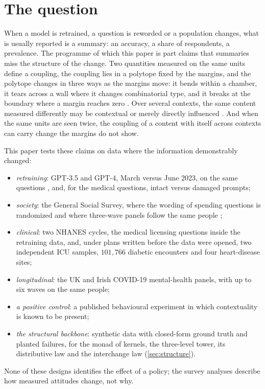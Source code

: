 \documentclass[11pt]{article}
\theoremstyle{definition}
\theoremstyle{remark}
\begin{document}
\tableofcontents

\section{The question}\label{sec:question}

When a model is retrained, a question is reworded or a population changes, what is usually reported is a summary: an accuracy, a share of
respondents, a prevalence. The programme of which this paper is part \cite{Bands,Bridges,Conditionals,Architecture} claims that
summaries miss the structure of the change. Two quantities measured on the same units define a coupling, the coupling lies in a polytope
fixed by the margins, and the polytope changes in three ways as the margins move: it bends within a chamber, it tears across a wall where
it changes combinatorial type, and it breaks at the boundary where a margin reaches zero \cite[Thm.~3.3]{Bands}. Over several contexts, the
same content measured differently may be contextual or merely directly influenced \cite[\S4]{Bridges}. And when the same units are seen
twice, the coupling of a content with itself across contexts can carry change the margins do not show.

This paper tests these claims on data where the information demonstrably changed:
\begin{itemize}[leftmargin=*,nosep]
\item \emph{retraining}: GPT-3.5 and GPT-4, March versus June 2023, on the same questions \cite{ChenZaharia2024}, and, for the medical
  questions, intact versus damaged prompts;
\item \emph{society}: the General Social Survey, where the wording of spending questions is randomized and where three-wave panels
  follow the same people \cite{GSS,Smith1987};
\item \emph{clinical}: two NHANES cycles, the medical licensing questions inside the retraining data, and, under plans written before
  the data were opened, two independent ICU samples, $101{,}766$ diabetic encounters and four heart-disease sites;
\item \emph{longitudinal}: the UK and Irish COVID-19 mental-health panels, with up to six waves on the same people;
\item \emph{a positive control}: a published behavioural experiment in which contextuality is known to be present;
\item \emph{the structural backbone}: synthetic data with closed-form ground truth and planted failures, for the monad of kernels, the
  three-level tower, its distributive law and the interchange law (\cref{sec:structure}).
\end{itemize}
None of these designs identifies the effect of a policy; the survey analyses describe how measured attitudes change, not why.
\end{document}
